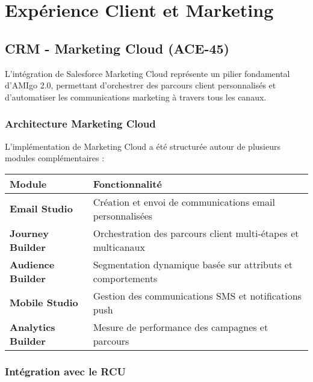 
\chapter{Expérience Client et Marketing}

\section{CRM - Marketing Cloud (ACE-45)}

\begin{mdframed}[backgroundcolor=lightgreen!20, linewidth=1pt]
L'intégration de Salesforce Marketing Cloud représente un pilier fondamental d'AMIgo 2.0, permettant d'orchestrer des parcours client personnalisés et d'automatiser les communications marketing à travers tous les canaux.
\end{mdframed}

\subsection{Architecture Marketing Cloud}

L'implémentation de Marketing Cloud a été structurée autour de plusieurs modules complémentaires :

\begin{center}
\begin{tabular}{|>{\bfseries}p{4cm}|p{9.5cm}|}
\hline
\rowcolor{lightblue} Module & Fonctionnalité \\
\hline
Email Studio & Création et envoi de communications email personnalisées \\
\hline
Journey Builder & Orchestration des parcours client multi-étapes et multicanaux \\
\hline
Audience Builder & Segmentation dynamique basée sur attributs et comportements \\
\hline
Mobile Studio & Gestion des communications SMS et notifications push \\
\hline
Analytics Builder & Mesure de performance des campagnes et parcours \\
\hline
\end{tabular}
\end{center}

\subsection{Intégration avec le RCU}

